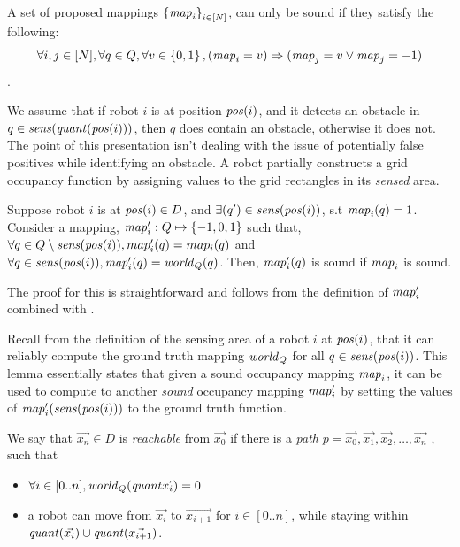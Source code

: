 A set of proposed mappings $\left\{\mathit{map}_i\right\}_{i\in [N]}$, can only be sound if they satisfy the following: $$\forall i,j \in [N],\forall q\in Q, \forall v \in \left\{0,1\right\}, (\mathit{map}_i = v) \Rightarrow (\mathit{map}_j = v \vee \mathit{map}_j = -1)$$.

We assume that if robot $i$ is at position $\mathit{pos}(i)$, and it detects an obstacle in $q \in \mathit{sens}(\mathit{quant}(\mathit{pos}(i)))$, then $q$ does contain an obstacle, otherwise it does not. The point of this presentation isn't dealing with the issue of potentially false positives while identifying an obstacle. A robot partially constructs a grid occupancy function by assigning values to the grid rectangles in its \emph{sensed} area.

\begin{lemma}
    \label{ext}
    Suppose robot $i$ is at $\mathit{pos}(i)\in D$, and $\exists(q^\prime)\in \mathit{sens}(\mathit{pos}(i))$,
    s.t $\mathit{map}_i(q) = 1$. Consider a mapping, $\mathit{map}^\prime_i:Q \mapsto \left\{-1,0,1\right\}$
    such that, $\forall q\in Q \setminus \mathit{sens}(\mathit{pos}(i)), map^\prime_i(q) = map_i(q)$
    and $\forall q \in \mathit{sens}(\mathit{pos}(i)), \mathit{map}^\prime_i(q) = \mathit{world}_Q(q)$.
    Then, $\mathit{map}^\prime_i(q)$ is sound if $\mathit{map}_i$ is sound.
\end{lemma}

The proof for this is straightforward and follows from the definition of $\mathit{map}^\prime_i$ combined with .

Recall from the definition of the sensing area of a robot $i$ at $\mathit{pos}(i)$, that it can reliably compute the ground truth mapping $\mathit{world}_Q$ for all $q \in \mathit{sens}(\mathit{pos}(i))$. This lemma essentially states that given a sound occupancy mapping $\mathit{map}_i$, it can be used to compute to another \emph{sound} occupancy mapping $\mathit{map}^\prime_i$ by setting the values of $\mathit{map}^\prime_i(\mathit{sens}(\mathit{pos}(i)))$ to the ground truth function.

\begin{definition}
 We say that $\Vec{x_n}\in D$ is \emph{reachable} from $\Vec{x_0}$ if there is a \emph{path} $p = \Vec{x_0},\Vec{x_1}, \Vec{x_2},\ldots, \Vec{x_n}$ , such that
\begin{itemize}
\item $\forall i \in [0..n],\mathit{world}_Q(\mathit{quant}{\Vec{x_i}}) = 0$
\item a robot can move from $\Vec{x_i}$ to $\Vec{x_{i+1}}$ for $i \in [0..n]$, while staying within $\mathit{quant}(\Vec{x_i}) \cup \mathit{quant}(\Vec{x_{i+1}})$.
\end{itemize}
\end{definition}

